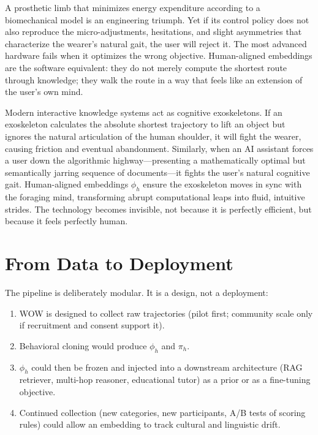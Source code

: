 \documentclass[11pt,a4paper]{report}
\begin{document}
A prosthetic limb that minimizes energy expenditure according to a biomechanical model is an engineering triumph. Yet if its control policy does not also reproduce the micro-adjustments, hesitations, and slight asymmetries that characterize the wearer’s natural gait, the user will reject it. The most advanced hardware fails when it optimizes the wrong objective. Human-aligned embeddings are the software equivalent: they do not merely compute the shortest route through knowledge; they walk the route in a way that feels like an extension of the user’s own mind.

Modern interactive knowledge systems act as cognitive exoskeletons. If an exoskeleton calculates the absolute shortest trajectory to lift an object but ignores the natural articulation of the human shoulder, it will fight the wearer, causing friction and eventual abandonment. Similarly, when an AI assistant forces a user down the algorithmic highway—presenting a mathematically optimal but semantically jarring sequence of documents—it fights the user's natural cognitive gait. Human-aligned embeddings \(\phi_h\) ensure the exoskeleton moves in sync with the foraging mind, transforming abrupt computational leaps into fluid, intuitive strides. The technology becomes invisible, not because it is perfectly efficient, but because it feels perfectly human.

\section{From Data to Deployment}

The pipeline is deliberately modular. It is a design, not a deployment:

\begin{enumerate}
    \item WOW is designed to collect raw trajectories (pilot first; community scale only if recruitment and consent support it).
    \item Behavioral cloning would produce \(\phi_h\) and \(\pi_h\).
    \item \(\phi_h\) could then be frozen and injected into a downstream architecture (RAG retriever, multi-hop reasoner, educational tutor) as a prior or as a fine-tuning objective.
    \item Continued collection (new categories, new participants, A/B tests of scoring rules) could allow an embedding to track cultural and linguistic drift.
\end{enumerate}
\end{document}
